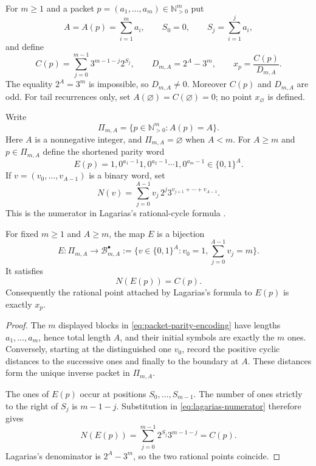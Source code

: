For $m\ge1$ and a packet $p=(a_1,\ldots,a_m)\in\mathbb N_{>0}^{m}$ put
\[
 A=A(p)=\sum_{i=1}^{m}a_i,
 \qquad S_0=0,\qquad S_j=\sum_{i=1}^{j}a_i,
\]
and define
\begin{equation}
 C(p)=\sum_{j=0}^{m-1}3^{m-1-j}2^{S_j},
 \qquad D_{m,A}=2^A-3^m,
 \qquad x_p=\frac{C(p)}{D_{m,A}}.
 \label{eq:packet-C-D-x}
\end{equation}
The equality $2^A=3^m$ is impossible, so $D_{m,A}\ne0$.  Moreover
$C(p)$ and $D_{m,A}$ are odd.  For tail recurrences only, set
$A(\varnothing)=C(\varnothing)=0$; no point $x_{\varnothing}$ is defined.

Write
\[
 \Pi_{m,A}=\{p\in\mathbb N_{>0}^{m}:A(p)=A\}.
\]
Here $A$ is a nonnegative integer, and $\Pi_{m,A}=\varnothing$ when
$A<m$.  For $A\ge m$ and $p\in\Pi_{m,A}$ define the shortened parity word
\begin{equation}
 E(p)=1,0^{a_1-1}1,0^{a_2-1}\cdots1,0^{a_m-1}
 \in\{0,1\}^{A}.
 \label{eq:packet-parity-encoding}
\end{equation}
If $v=(v_0,\ldots,v_{A-1})$ is a binary word, set
\begin{equation}
 N(v)=\sum_{j=0}^{A-1}v_j\,2^j
       3^{v_{j+1}+\cdots+v_{A-1}}.
 \label{eq:lagarias-numerator}
\end{equation}
This is the numerator in Lagarias's rational-cycle formula
\cite[Theorem~2.1]{Lagarias1990}.

\begin{theorem}
\label{thm:packet-parity-coordinate-isomorphism}
For fixed $m\ge1$ and $A\ge m$, the map $E$ is a bijection
\[
 E:\Pi_{m,A}\longrightarrow
 \mathcal B_{m,A}^{\bullet}:=
 \{v\in\{0,1\}^{A}:v_0=1,
              \textstyle\sum_{j=0}^{A-1}v_j=m\}.
\]
It satisfies
\[
 N(E(p))=C(p).
\]
Consequently the rational point attached by Lagarias's formula to $E(p)$ is
exactly $x_p$.
\end{theorem}

\begin{proof}
The $m$ displayed blocks in \eqref{eq:packet-parity-encoding} have lengths
$a_1,\ldots,a_m$, hence total length $A$, and their initial symbols are
exactly the $m$ ones.  Conversely, starting at the distinguished one $v_0$,
record the positive cyclic distances to the successive ones and finally to
the boundary at $A$.  These distances form the unique inverse packet in
$\Pi_{m,A}$.

The ones of $E(p)$ occur at positions $S_0,\ldots,S_{m-1}$.  The number of
ones strictly to the right of $S_j$ is $m-1-j$.  Substitution in
\eqref{eq:lagarias-numerator} therefore gives
\[
 N(E(p))=\sum_{j=0}^{m-1}2^{S_j}3^{m-1-j}=C(p).
\]
Lagarias's denominator is $2^A-3^m$, so the two rational points coincide.
\end{proof}

